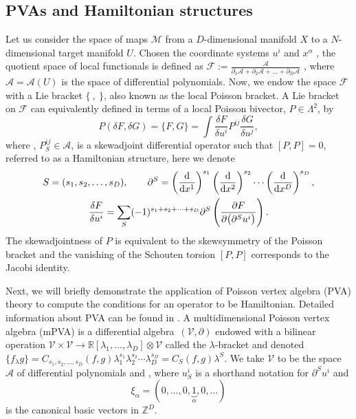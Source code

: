 \documentclass[10pt,a4paper]{amsart}
\numberwithin{equation}{section}
\begin{document}
\subsection{PVAs and Hamiltonian structures}
Let us consider the space of maps $\mathcal{M}$ from a $D$-dimensional manifold $X$ to a $N$-dimensional target manifold $U$. Chosen the coordinate systems ${u^i}$ and ${x^\alpha}$ , the quotient space of local functionals is defined as $\mathcal{F}:=\frac{\mathcal{A}}{\partial_1\mathcal{A}+\partial_2\mathcal{A}+\dots+\partial_D\mathcal{A}}$ \cite{olver1993applications}, where $\mathcal{A}=\mathcal{A}(U)$ is the space of differential polynomials. Now, we endow the space $\mathcal{F}$ with a Lie bracket $\lbrace \ , \ \rbrace$, also known as the local Poisson bracket.
A Lie bracket on $\mathcal F$ can equivalently defined in terms of a local Poisson bivector, $P \in \Lambda^2$, by
\begin{equation}\label{eq:pb-def}
P(\delta F,\delta G)=\lbrace F,G \rbrace =\int \frac{\delta F}{\delta u^i}P^{ij}\frac{\delta G}{\delta u^j},
\end{equation}
where , $P^{ij}_S \in \mathcal{A}$, is a skewadjoint differential operator such that $[P,P]=0$, referred to as a Hamiltonian structure, here we denote
\begin{gather*}
S=(s_1,s_2,\dots,s_D), \qquad \partial^S=\left(\frac{{\rm d}}{{\rm d}x^1}\right)^{s_1}\left(\frac{\rm d}{{\rm d}x^2}\right)^{s_2}\cdots\left(\frac{\rm d}{{\rm d}x^D}\right)^{s_D}, \\ \frac{\delta F}{\delta u^i}=\sum\limits_{S}(-1)^{s_1+s_2+\dots+s_D}\partial^S\left(\frac{\partial F}{\partial\big(\partial^Su^i\big)}\right).
\end{gather*}
 The skewadjointness of $P$ is equivalent to the skewsymmetry of the Poisson bracket and the vanishing of the Schouten torsion $[P,P]$ \cite{olver1993applications} corresponds to the Jacobi identity.

Next, we will briefly demonstrate the application of Poisson vertex algebra (PVA) theory to compute the conditions for an operator to be Hamiltonian. Detailed information about PVA can be found in \cite{barakat2009poisson}. A multidimensional Poisson vertex algebra (mPVA) is a differential algebra~$(\mathcal{V}, \partial)$ endowed with
a bilinear operation $\mathcal{V} \times \mathcal{V}\rightarrow \mathbb{R}[\lambda_1,\dots,\lambda_D] \otimes\mathcal{V}$ called the $\lambda$-bracket and denoted $\lbrace f_{\lambda} g\rbrace=C_{s_1,s_2,\dots,s_D}(f,g)\lambda^{s_1}_1\lambda^{s_2}_2\cdots\lambda^{s_D}_D=C_S(f,g)\lambda^S$. We take $\mathcal{V}$ to be the space $\mathcal{A}$ of differential polynomials and , where $u^i_S$ is a shorthand notation for $\partial^S u^i$ and
 \[
\xi_{\alpha}=(0,\ldots,0,\underbrace{1}_{\alpha},0,\ldots)
\] is the canonical basic vectors in $\mathbb{Z}^D$.
\end{document}
